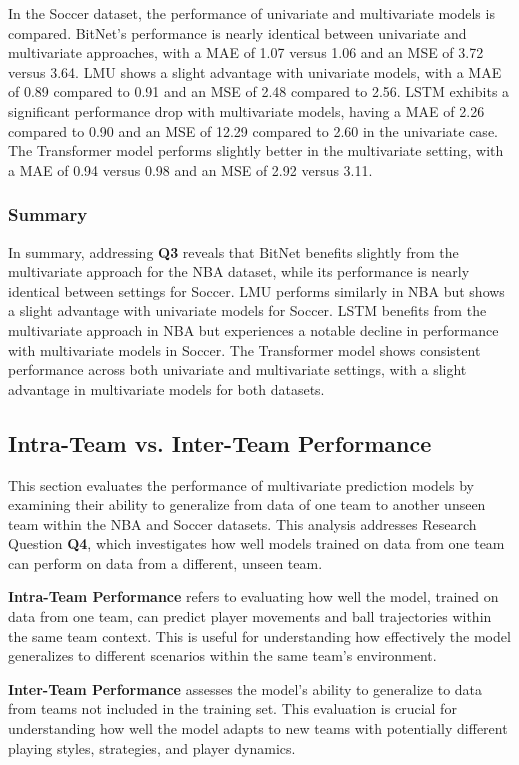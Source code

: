 In the Soccer dataset, the performance of univariate and multivariate models is compared. BitNet’s performance is nearly identical between univariate and multivariate approaches, with a MAE of 1.07 versus 1.06 and an MSE of 3.72 versus 3.64. LMU shows a slight advantage with univariate models, with a MAE of 0.89 compared to 0.91 and an MSE of 2.48 compared to 2.56. LSTM exhibits a significant performance drop with multivariate models, having a MAE of 2.26 compared to 0.90 and an MSE of 12.29 compared to 2.60 in the univariate case. The Transformer model performs slightly better in the multivariate setting, with a MAE of 0.94 versus 0.98 and an MSE of 2.92 versus 3.11.

\subsubsection{Summary}
In summary, addressing \textbf{Q3} reveals that BitNet benefits slightly from the multivariate approach for the NBA dataset, while its performance is nearly identical between settings for Soccer. LMU performs similarly in NBA but shows a slight advantage with univariate models for Soccer. LSTM benefits from the multivariate approach in NBA but experiences a notable decline in performance with multivariate models in Soccer. The Transformer model shows consistent performance across both univariate and multivariate settings, with a slight advantage in multivariate models for both datasets.

\subsection{Intra-Team vs. Inter-Team Performance}
\label{exp:intra_inter}

This section evaluates the performance of multivariate prediction models by examining their ability to generalize from data of one team to another unseen team within the NBA and Soccer datasets. This analysis addresses Research Question \textbf{Q4}, which investigates how well models trained on data from one team can perform on data from a different, unseen team.

\textbf{Intra-Team Performance} refers to evaluating how well the model, trained on data from one team, can predict player movements and ball trajectories within the same team context. This is useful for understanding how effectively the model generalizes to different scenarios within the same team’s environment.

\textbf{Inter-Team Performance} assesses the model’s ability to generalize to data from teams not included in the training set. This evaluation is crucial for understanding how well the model adapts to new teams with potentially different playing styles, strategies, and player dynamics.


